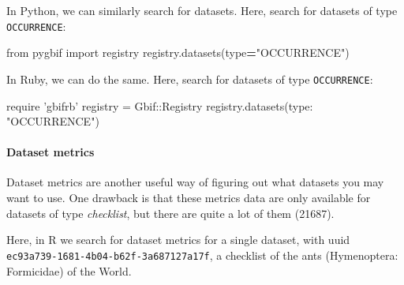 \documentclass[author-year, review, 11pt]{components/elsarticle} %
\newenvironment{Shaded}{\begin{snugshade}}{\end{snugshade}}
\newcommand{\KeywordTok}[1]{\textcolor[rgb]{0.13,0.29,0.53}{\textbf{#1}}}
\newcommand{\DataTypeTok}[1]{\textcolor[rgb]{0.13,0.29,0.53}{#1}}
\newcommand{\StringTok}[1]{\textcolor[rgb]{0.31,0.60,0.02}{#1}}
\newcommand{\ImportTok}[1]{#1}
\newcommand{\OperatorTok}[1]{\textcolor[rgb]{0.81,0.36,0.00}{\textbf{#1}}}
\newcommand{\BuiltInTok}[1]{#1}
\newcommand{\NormalTok}[1]{#1}
\begin{document}
In Python, we can similarly search for datasets. Here, search for
datasets of type \texttt{OCCURRENCE}:

\begin{Shaded}
\begin{Highlighting}[]
\ImportTok{from}\NormalTok{ pygbif }\ImportTok{import}\NormalTok{ registry}
\NormalTok{registry.datasets(}\BuiltInTok{type}\OperatorTok{=}\StringTok{"OCCURRENCE"}\NormalTok{)}
\end{Highlighting}
\end{Shaded}

In Ruby, we can do the same. Here, search for datasets of type
\texttt{OCCURRENCE}:

\begin{Shaded}
\begin{Highlighting}[]
\NormalTok{require }\StringTok{'gbifrb'}
\NormalTok{registry = }\DataTypeTok{Gbif}\NormalTok{::}\DataTypeTok{Registry}
\NormalTok{registry.datasets(}\StringTok{type: "OCCURRENCE"}\NormalTok{)}
\end{Highlighting}
\end{Shaded}

\paragraph{Dataset metrics}\label{dataset-metrics}

Dataset metrics are another useful way of figuring out what datasets you
may want to use. One drawback is that these metrics data are only
available for datasets of type \emph{checklist}, but there are quite a
lot of them (21687).

Here, in R we search for dataset metrics for a single dataset, with uuid
\texttt{ec93a739-1681-4b04-b62f-3a687127a17f}, a checklist of the ants
(Hymenoptera: Formicidae) of the World.

\begin{Shaded}
\end{Shaded}
\end{document}
